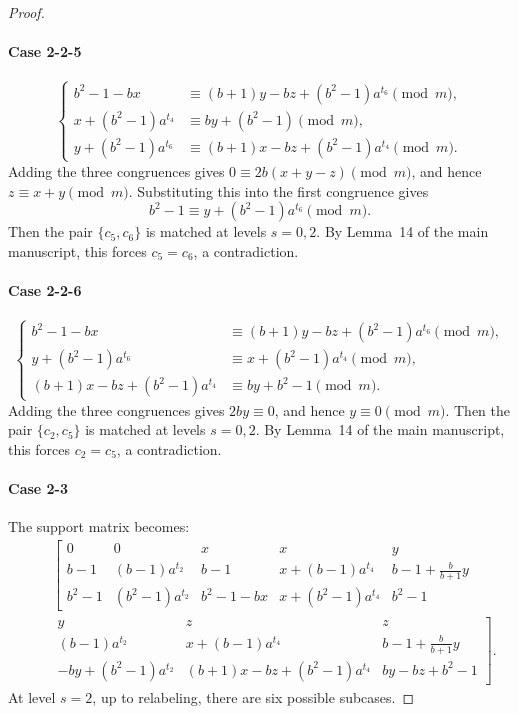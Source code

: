 \documentclass[11pt]{article}
\newcommand{\mymod}{\pmod{m}}
\begin{document}
\begin{proof}
\paragraph{Case 2-2-5}
$$
\begin{cases}
	b^2-1-bx &\equiv (b+1)y-bz+(b^2-1)a^{t_6}\mymod, \\
	x+(b^2-1)a^{t_4} &\equiv by+(b^2-1)\mymod, \\
	y+(b^2-1)a^{t_6} &\equiv (b+1)x-bz+(b^2-1)a^{t_4}\mymod.
\end{cases}
$$
Adding the three congruences gives $0\equiv2b(x+y-z)\mymod$, and hence $z\equiv x+y\mymod$. 
Substituting this into the first congruence gives 
$$
b^2-1\equiv y+(b^2-1)a^{t_6}\mymod.
$$
Then the pair $\{c_5,c_6\}$ is matched at levels $s=0,2$. By
Lemma~14 of the main manuscript, this forces $c_5=c_6$, a contradiction.

\paragraph{Case 2-2-6}
$$
\begin{cases}
	b^2-1-bx &\equiv (b+1)y-bz+(b^2-1)a^{t_6}\mymod, \\
	y+(b^2-1)a^{t_6} &\equiv  x+(b^2-1)a^{t_4}\mymod,\\
	(b+1)x-bz+(b^2-1)a^{t_4} &\equiv by+b^2-1\mymod.
\end{cases}
$$
Adding the three congruences gives $2by\equiv0$, and hence $y\equiv0\mymod$. 
Then the pair $\{c_2,c_5\}$ is matched at levels $s=0,2$. By Lemma~14 of the main manuscript, this forces $c_2=c_5$, a
contradiction.

\paragraph{Case 2-3}
The support matrix becomes:
\begin{eqnarray*}
		~&~&\left[\begin{array}{ccccc}
			0 & 0 & x & x & y\\
			b-1 & (b-1)a^{t_2} & b-1 & x+(b-1)a^{t_4} & b-1+\frac{b}{b+1}y\\
            b^2 -1 & (b^2-1)a^{t_2} & b^2-1-bx & x+(b^2-1)a^{t_4} & b^2-1 
            \end{array}
            \right.\\
		~&~& \left. \begin{array}{ccc}    
			y & z & z\\ 
			  (b-1)a^{t_2} & x+(b-1)a^{t_4}  & b-1+\frac{b}{b+1}y\\
			-by+(b^2-1)a^{t_2} & (b+1)x-bz+(b^2-1)a^{t_4} & by-bz+b^2-1
        \end{array}
        \right]
        .
\end{eqnarray*}
At level $s=2$, up to relabeling, there are six possible subcases.


\end{proof}
\end{document}
